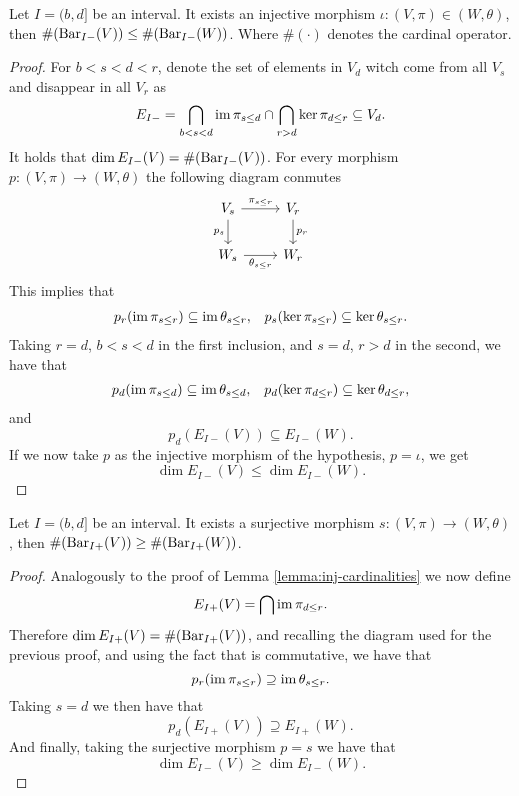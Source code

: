 \begin{lemma}  \cite[Proposition 3.1.1]{polterovich} \label{lemma:inj-cardinalities}
    Let $ I = (b, d] $ be an interval. It exists an injective morphism $\iota \colon (V, \pi) \in (W, \theta) $, then $\#(\operatorname{Bar}_{I-}(V)) \leq \#(\operatorname{Bar}_{I-}(W)) $. Where $ \#(\cdot) $ denotes the cardinal operator.
\end{lemma}
\begin{proof}
    For $ b < s < d < r $, denote the set of elements in $ V_d $ witch come from all $ V_s $ and disappear in all $ V_r $ as
    $$
        E_{I-} = \bigcap_{b < s < d} \operatorname{im} \pi_{s\leq d} \cap \bigcap_{r> d} \ker \pi_{d \leq r} \subseteq V_d.
    $$
    It holds that $ \dim E_{I-}(V) = \#(\operatorname{Bar}_{I-}(V)) $. For every morphism $ p\colon (V, \pi) \to (W, \theta) $ the following diagram conmutes
    $$
    \begin{tikzcd}
        V_s \arrow[r, "\pi_{s \leq r}"] \arrow[d, "p_s"'] & V_r \arrow[d, "p_r"] \\
        W_s \arrow[r, "\theta_{s \leq r}"']               & W_r
    \end{tikzcd}
    $$
    This implies that
    \begin{align}
        p_r(\operatorname{im} \pi_{s \leq r}) \subseteq \operatorname{im} \theta_{s \leq r}, & & p_s(\ker \pi_{s \leq r}) \subseteq \ker \theta_{s \leq r}.
    \end{align}
    Taking $ r = d $, $ b < s < d $ in the first inclusion, and $ s = d $, $ r > d $ in the second, we have that
    \begin{align}
        p_d(\operatorname{im} \pi_{s \leq d}) \subseteq \operatorname{im} \theta_{s \leq d}, & & p_d(\ker \pi_{d \leq r}) \subseteq \ker \theta_{d \leq r},
    \end{align}
    and 
    $$
        p_d(E_{I-}(V)) \subseteq E_{I-}(W).
    $$
    If we now take $ p $ as the injective morphism of the hypothesis, $ p = \iota $, we get
    $$
        \dim E_{I-}(V) \leq \dim E_{I-}(W).
    $$
\end{proof}
 
\begin{lemma} \cite[Exercise 3.1.3]{polterovich} \label{lemma:sur-cardinalities}
    Let $ I = (b, d] $ be an interval. It exists a surjective morphism $s\colon (V, \pi) \to (W, \theta) $, then $\#(\operatorname{Bar}_{I+}(V)) \geq \#(\operatorname{Bar}_{I+}(W)) $.
\end{lemma}
\begin{proof}
    Analogously to the proof of Lemma \ref{lemma:inj-cardinalities} we now define
    $$
        E_{I+}(V) = \bigcap \operatorname{im} \pi_{d \leq r}.
    $$
    Therefore $ \dim E_{I+}(V) = \#(\operatorname{Bar}_{I+}(V)) $, and recalling the diagram used for the previous proof, and using the fact that is commutative, we have that
    $$
        p_r(\operatorname{im} \pi_{s \leq r}) \supseteq \operatorname{im} \theta_{s \leq r}.
    $$
    Taking $ s = d $ we then have that
    $$
        p_d(E_{I+}(V)) \supseteq E_{I+}(W).
    $$
    And finally, taking the surjective morphism $ p = s $ we have that
    $$
        \dim E_{I-}(V) \geq \dim E_{I-}(W).
    $$
\end{proof}

